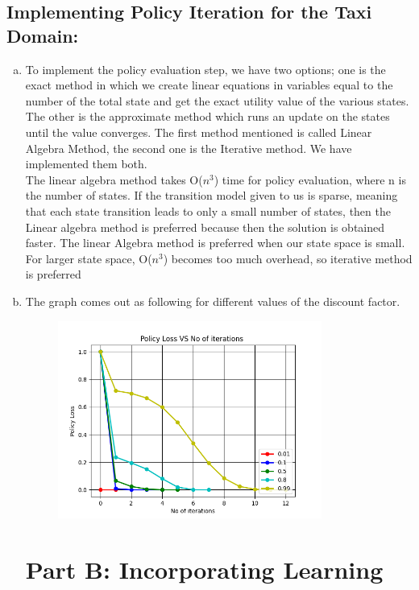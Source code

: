 \documentclass{article}
\begin{document}
\subsection{Implementing Policy Iteration for the Taxi Domain:}
\begin{enumerate}[a)]
    \item To implement the policy evaluation step, we have two options; one is the exact method in which we create linear equations in variables equal to the number of the total state and get the exact utility value of the various states. The other is the approximate method which runs an update on the states until the value converges.
The first method mentioned is called Linear Algebra Method, the second one is the Iterative method. We have implemented them both. \\
The linear algebra method takes O($n^3$) time for policy evaluation, where n is the number of states. If the transition model given to us is sparse, meaning that each state transition leads to only a small number of states, then the Linear algebra method is preferred because then the solution is obtained faster. The linear Algebra method is preferred when our state space is small. For larger state space, O($n^3$) becomes too much overhead, so iterative method is preferred
    \item The graph comes out as following for different values of the discount factor.
    \begin{center}
        \begin{figure}[h]
\hfill\includegraphics[height=6.5cm]{QA3b.png}\hspace*{\fill}
\end{figure}
\end{center}


\section{Part B: Incorporating Learning}



\end{enumerate}
\end{document}
